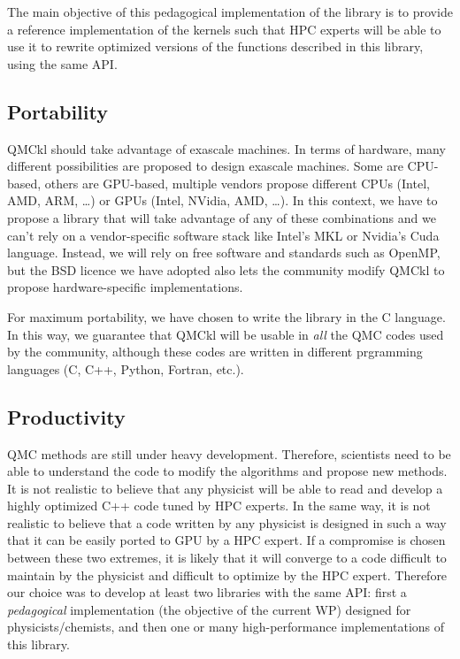 The main objective of this pedagogical implementation of the library
is to provide a reference implementation of the kernels such that
\ac{HPC} experts will be able to use it to rewrite optimized versions
of the functions described in this library, using the same \ac{API}.

\subsection{Portability}

\ac{QMCkl} should take advantage of exascale machines. In terms of hardware,
many different possibilities are proposed to design exascale
machines. Some are CPU-based, others are GPU-based, multiple vendors
propose different CPUs (Intel, AMD, ARM, \dots) or GPUs (Intel,
NVidia, AMD, \dots). In this context, we have to propose a library that
will take advantage of any of these combinations and we can't rely on 
a vendor-specific software stack like Intel's \ac{MKL} or Nvidia's
Cuda language. Instead, we
will rely on free software and standards such as OpenMP, but the BSD
licence we have adopted also lets the community modify \ac{QMCkl} to propose 
hardware-specific implementations.

For maximum portability, we have chosen to write the library in the C
language. In this way, we guarantee that \ac{QMCkl} will be usable in
\emph{all} the QMC codes used by the community, although these
codes are written in different prgramming languages (C, C++, Python,
Fortran, etc.).

\subsection{Productivity}

\ac{QMC} methods are still under heavy development. Therefore,
scientists need to be able to understand the code to modify the
algorithms and propose new methods. It is not realistic to believe
that any physicist will be able to read and develop a highly optimized
C++ code tuned by HPC experts. In the same way, it is not realistic to
believe that a code written by any physicist is designed in such a way
that it can be easily ported to GPU by a HPC expert. If a compromise
is chosen between these two extremes, it is likely that it will
converge to a code difficult to maintain by the physicist and
difficult to optimize by the HPC expert. Therefore our choice was to
develop at least two libraries with the same \ac{API}: first a
\emph{pedagogical} implementation (the objective of the current \ac{WP})
designed for physicists/chemists, and then one or many
high-performance implementations of this library.

